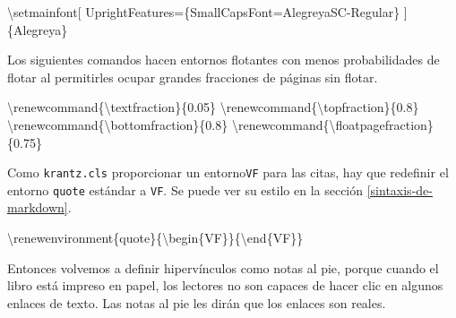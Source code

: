 \documentclass[12pt,]{krantz}
\makeatletter
\newenvironment{Shaded}{\begin{snugshade}}{\end{snugshade}}
\newcommand{\NormalTok}[1]{{#1}}
\newenvironment{kframe}{%
\medskip{}
\setlength{\fboxsep}{.8em}
 \def\at@end@of@kframe{}%
 \ifinner\ifhmode%
  \def\at@end@of@kframe{\end{minipage}}%
  \begin{minipage}{\columnwidth}%
 \fi\fi%
 \def\FrameCommand##1{\hskip\@totalleftmargin \hskip-\fboxsep
 \colorbox{shadecolor}{##1}\hskip-\fboxsep
     \hskip-\linewidth \hskip-\@totalleftmargin \hskip\columnwidth}%
 \MakeFramed {\advance\hsize-\width
   \@totalleftmargin\z@ \linewidth\hsize
   \@setminipage}}%
 {\par\unskip\endMakeFramed%
 \at@end@of@kframe}
\renewenvironment{Shaded}{\begin{kframe}}{\end{kframe}}
\theoremstyle{definition}
\theoremstyle{definition}
\theoremstyle{remark}
\makeatother
\begin{document}
\begin{Shaded}
\begin{Highlighting}[]
\NormalTok{\textbackslash{}setmainfont[}
  \NormalTok{UprightFeatures=\{SmallCapsFont=AlegreyaSC-Regular\}}
\NormalTok{]\{Alegreya\}}
\end{Highlighting}
\end{Shaded}

Los siguientes comandos hacen entornos flotantes
 con menos probabilidades de flotar al
permitirles ocupar grandes fracciones de páginas sin flotar.

\begin{Shaded}
\begin{Highlighting}[]
\NormalTok{\textbackslash{}renewcommand\{\textbackslash{}textfraction\}\{0.05\}}
\NormalTok{\textbackslash{}renewcommand\{\textbackslash{}topfraction\}\{0.8\}}
\NormalTok{\textbackslash{}renewcommand\{\textbackslash{}bottomfraction\}\{0.8\}}
\NormalTok{\textbackslash{}renewcommand\{\textbackslash{}floatpagefraction\}\{0.75\}}
\end{Highlighting}
\end{Shaded}

Como \texttt{krantz.cls} proporcionar un entorno\texttt{VF} para las
citas, hay que redefinir el entorno \texttt{quote} estándar a
\texttt{VF}. Se puede ver su estilo en la sección
\ref{sintaxis-de-markdown}.

\begin{Shaded}
\begin{Highlighting}[]
\NormalTok{\textbackslash{}renewenvironment\{quote\}\{\textbackslash{}begin\{VF\}\}\{\textbackslash{}end\{VF\}\}}
\end{Highlighting}
\end{Shaded}

Entonces volvemos a definir hipervínculos como notas al pie, porque
cuando el libro está impreso en papel, los lectores no son capaces de
hacer clic en algunos enlaces de texto. Las notas al pie les dirán que
los enlaces son reales.

\begin{Shaded}
\end{Shaded}
\end{document}
